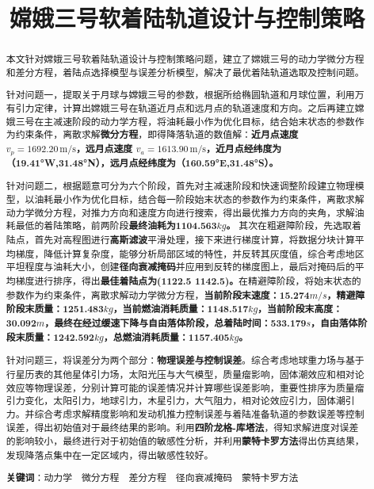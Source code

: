 \documentclass{ctexart}
\title{嫦娥三号软着陆轨道设计与控制策略}
\date{}
\author{}
\begin{document}
\maketitle
\renewcommand{\abstractname}{\Large\textbf{摘要}\\} %
\vspace{-4em} %
\begin{abstract}
\normalsize
本文针对嫦娥三号软着陆轨道设计与控制策略问题，建立了嫦娥三号的动力学微分方程和差分方程，着陆点选择模型与误差分析模型，解决了最优着陆轨道选取及控制问题。

针对问题一，提取关于月球与嫦娥三号的参数，根据所给椭圆轨道和月球位置，利用万有引力定律，计算出嫦娥三号在轨道近月点和远月点的轨道速度和方向。之后再建立嫦娥三号在主减速阶段的动力学方程，将油耗最小作为优化目标，结合始末状态的参数作为约束条件，离散求解\textbf{微分方程}，即得降落轨道的数值解：\textbf{近月点速度$v_p = 1692.20 \, \text{m/s}$，远月点速度
$v_a = 1613.90 \, \text{m/s}$，近月点经纬度为（19.41°W,31.48°N），远月点经纬度为（160.59°E,31.48°S）。}

针对问题二，根据题意可分为六个阶段，首先对主减速阶段和快速调整阶段建立物理模型，以油耗最小作为优化目标，结合每一阶段始末状态的参数作为约束条件，离散求解动力学微分方程，对推力方向和速度方向进行搜索，得出最优推力方向的夹角，求解油耗最低的着陆策略，前两阶段\textbf{最终油耗为1104.563\(kg\)。}
其次在粗避障阶段，先选取着陆点，首先对高程图进行\textbf{高斯滤波}平滑处理，接下来进行梯度计算，将数据分块计算平均梯度，降低计算复杂度，能够分析局部区域的特性，并反转其灰度值，综合考虑地区平坦程度与油耗大小，创建\textbf{径向衰减掩码}并应用到反转的梯度图上，最后对掩码后的平均梯度进行排序，得出\textbf{最佳着陆点为(1122.5 1142.5)。}在精避障阶段，将始末状态的参数作为约束条件，离散求解动力学微分方程，\textbf{当前阶段末速度：15.274\(m/s\)，精避障阶段末质量：1251.483\(kg\)，当前燃油消耗质量：1148.517\(kg\)，当前阶段末高度：30.092\(m\)，最终在经过缓速下降与自由落体阶段，总着陆时间：533.179\(s\)，自由落体阶段末质量：1242.592\(kg\)，总燃油消耗质量：1157.405\(kg\)。}

针对问题三，将误差分为两个部分：\textbf{物理误差与控制误差}。综合考虑地球重力场与基于行星历表的其他星体引力场，太阳光压与大气模型，质量瘤影响，固体潮效应和相对论效应等物理误差，分别计算可能的误差情况并计算哪些误差影响，重要性排序为质量瘤引力变化，太阳引力，地球引力，木星引力，大气阻力，相对论效应引力，固体潮引力。并综合考虑求解精度影响和发动机推力控制误差与着陆准备轨道的参数误差等控制误差，得出初始值对于最终结果的影响。利用\textbf{四阶龙格-库塔法}，得知求解进度对误差的影响较小，最终进行对于初始值的敏感性分析，并利用\textbf{蒙特卡罗方法}得出仿真结果，发现降落点集中在一定区域内，得出敏感性较好。

\textbf{关键词}：动力学\  \ 微分方程\  \ 差分方程\  \ 径向衰减掩码\  \ 蒙特卡罗方法
\end{abstract}
\newpage
\end{document}
